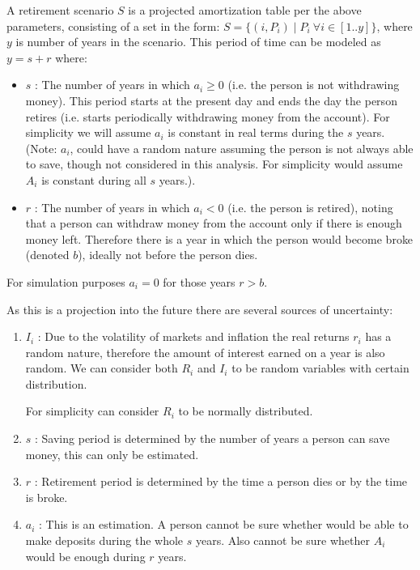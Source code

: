 \documentclass[10pt]{article}
\begin{document}
A retirement scenario $S$ is a projected amortization table per the above parameters, consisting of a set in the form: $S= \{ (i,P_i) \mid  P_i ~ \forall i \in [1..y] \}$, where $y$ is number of years in the scenario.  This period of time can be modeled as $y=s+r$ where:
\begin{itemize}
\item $s$ : The number of years in which $a_i \geq 0$ (i.e. the person is not withdrawing money).  This period starts at the present day and ends the day the person retires (i.e. starts periodically withdrawing money from the account).  For simplicity we will assume $a_i$ is constant in real terms during the $s$ years. \\
(Note: $a_i$, could have a random nature assuming the person is not always able to save, though not considered in this analysis.  For simplicity would assume $A_i$ is constant during all $s$ years.).
\item $r$ : The number of years in which $a_i < 0$ (i.e. the person is retired), noting that a person can withdraw money from the account only if there is enough money left.  Therefore there is a year in which the person would become broke (denoted $b$), ideally not before the person dies.  

\end{itemize}

For simulation purposes $a_i=0$ for those years $r>b$.


As this is a projection into the future there are several sources of uncertainty:

\begin{enumerate}
\item $I_i$ : Due to the volatility of markets and inflation the real returns $r_i$ has a random nature, therefore the amount of interest earned on a year is also random.  We can consider both $R_i$ and $I_i$ to be random variables with certain distribution.  

For simplicity can consider $R_i$ to be normally distributed.

\item $s$ : Saving period is determined by the number of years a person can save money, this can only be estimated.

\item $r$ : Retirement period is determined by the time a person dies or by the time is broke.

\item $a_i$ : This is an estimation.  A person cannot be sure whether would be able to make deposits during the whole $s$ years.  Also cannot be sure whether $A_i$ would be enough during $r$ years.
\end{enumerate}
\end{document}
